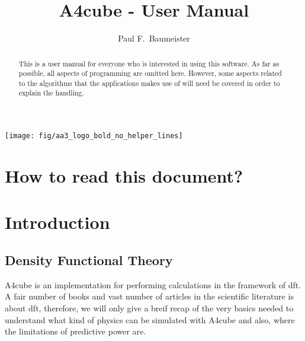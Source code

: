 \documentclass[oribibl]{llncs}
\newcommand{\codename}{A4cube}
\begin{document}
\pagestyle{plain}

\title       {\codename{} - User Manual}
\titlerunning{\codename{}}

\author{%
  Paul F.~Baumeister %
}


\maketitle

\begin{figure*}
	\centering
	\texttt{[image: fig/aa3\_logo\_bold\_no\_helper\_lines]} %
\end{figure*}

\begin{abstract}
This is a user manual for everyone who is interested in using
this software.
As far as possible, all aspects of programming are omitted here.
However, some aspects related to the algorithms that the applications 
makes use of will need be covered in order to explain the handling.
\end{abstract}

\section*{How to read this document?}

\newpage
\section{Introduction} \label{sec:intro}
%
\subsection{Density Functional Theory}
\codename{} is an implementation for performing calculations in the framework of \ac{dft}.
A fair number of books and vast number of articles in the scientific 
literature is about \ac{dft}, therefore, we will only give a breif recap 
of the very basics needed to understand what kind of physics can be
simulated with \codename{} and also, where the limitations of predictive power
are.
\end{document}
